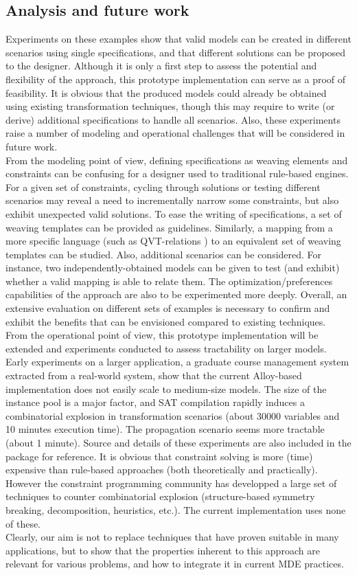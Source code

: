 \documentclass{llncs}
\begin{document}
\subsection{Analysis and future work}
%
Experiments on these examples show that valid models can be created in different scenarios using single specifications, and that different solutions can be proposed to the designer. Although it is only a first step to assess the potential and flexibility of the approach, this prototype implementation can serve as a proof of feasibility. It is obvious that the produced models could already be obtained using existing transformation techniques, though this may require to write (or derive) additional specifications to handle all scenarios. Also, these experiments raise a number of modeling and operational challenges that will be considered in future work.\\
From the modeling point of view, defining specifications as weaving elements and constraints can be confusing for a designer used to traditional rule-based engines. For a given set of constraints, cycling through solutions or testing different scenarios may reveal a need to incrementally narrow some constraints, but also exhibit unexpected valid solutions. To ease the writing of specifications, a set of weaving templates can be provided as guidelines. Similarly, a mapping from a more specific language (such as QVT-relations \cite{QVT}) to an equivalent set of weaving templates can be studied. Also, additional scenarios can be considered. For instance, two independently-obtained models can be given to test (and exhibit) whether a valid mapping is able to relate them. The optimization/preferences capabilities of the approach are also to be experimented more deeply. Overall, an extensive evaluation on different sets of examples is necessary to confirm and exhibit the benefits that can be envisioned compared to existing techniques.\\
From the operational point of view, this prototype implementation will be extended and experiments conducted to assess tractability on larger models. Early experiments on a larger application, a graduate course management system extracted from a real-world system, show that the current Alloy-based implementation does not easily scale to medium-size models. The size of the instance pool is a major factor, and SAT compilation rapidly induces a combinatorial explosion in transformation scenarios (about 30000 variables and 10 minutes execution time). The propagation scenario seems more tractable (about 1 minute). Source and details of these experiments are also included in the package for reference. It is obvious that constraint solving is more (time) expensive than rule-based approaches (both theoretically and practically). However the constraint programming community has developped a large set of techniques to counter combinatorial explosion (structure-based symmetry breaking, decomposition, heuristics, etc.). The current implementation uses none of these.\\
Clearly, our aim is not to replace techniques that have proven suitable in many applications, but to show that the properties inherent to this approach are relevant for various problems, and how to integrate it in current MDE practices.
%
\end{document}
